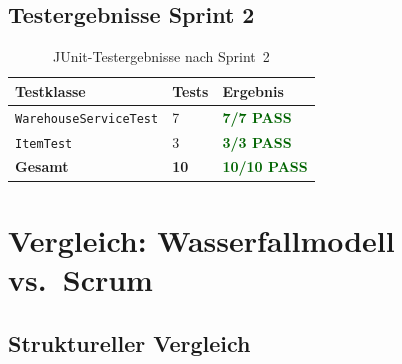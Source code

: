 \documentclass[12pt, a4paper, twoside]{report}
\begin{document}
\section{Testergebnisse Sprint 2}

\begin{table}[H]
  \centering
  \caption{JUnit-Testergebnisse nach Sprint~2}
  \label{tab:testergebnisse}
  \begin{tabularx}{0.8\textwidth}{L{6cm} C{2cm} C{2cm}}
    \toprule
    \textbf{Testklasse} & \textbf{Tests} & \textbf{Ergebnis} \\
    \midrule
    \texttt{WarehouseServiceTest}  & 7 & \textcolor{darkGreen}{\textbf{7/7 PASS}} \\
    \texttt{ItemTest}              & 3 & \textcolor{darkGreen}{\textbf{3/3 PASS}} \\
    \midrule
    \textbf{Gesamt}                & \textbf{10} & \textcolor{darkGreen}{\textbf{10/10 PASS}} \\
    \bottomrule
  \end{tabularx}
\end{table}

\chapter{Vergleich: Wasserfallmodell vs.\ Scrum}
\label{chap:vergleich}

\section{Struktureller Vergleich}
\end{document}
